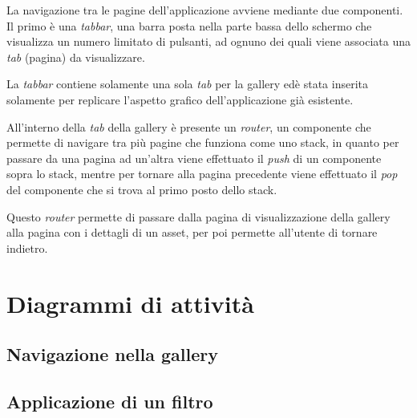 La navigazione tra le pagine dell'applicazione avviene mediante due componenti.
Il primo è una \textit{tabbar}, una barra posta nella parte bassa dello schermo che visualizza un numero limitato di pulsanti, ad ognuno dei quali viene associata una \textit{tab} (pagina) da visualizzare. 

La \textit{tabbar} contiene solamente una sola \textit{tab} per la gallery edè stata inserita solamente per replicare l'aspetto grafico dell'applicazione già esistente.

All'interno della \textit{tab} della gallery è presente un \textit{router}, un componente che permette di navigare tra più pagine che funziona come uno stack, in quanto per passare da una pagina ad un'altra viene effettuato il \textit{push} di un componente sopra lo stack, mentre per tornare alla pagina precedente viene effettuato il \textit{pop} del componente che si trova al primo posto dello stack.

Questo \textit{router} permette di passare dalla pagina di visualizzazione della gallery alla pagina con i dettagli di un asset, per poi permette all'utente di tornare indietro.

\section{Diagrammi di attività}
\subsection{Navigazione nella gallery}

\subsection{Applicazione di un filtro}
